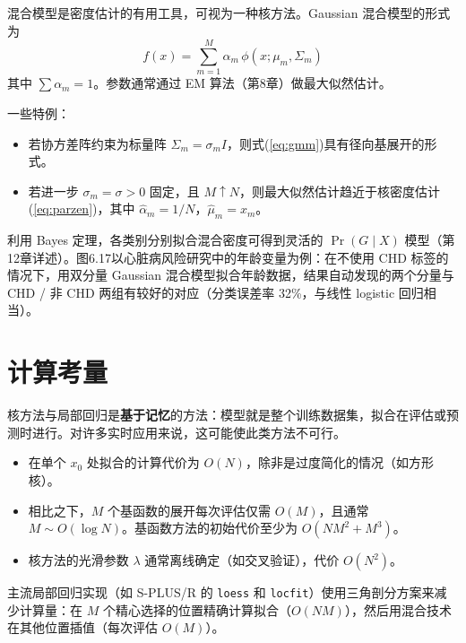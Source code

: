 混合模型是密度估计的有用工具，可视为一种核方法。Gaussian 混合模型的形式为
\begin{equation}\label{eq:gmm}
    f(x) = \sum_{m=1}^{M} \alpha_m \, \phi(x; \mu_m, \Sigma_m)
\end{equation}
其中 $\sum \alpha_m = 1$。参数通常通过 EM 算法（第8章）做最大似然估计。

一些特例：
\begin{itemize}
    \item 若协方差阵约束为标量阵 $\Sigma_m = \sigma_m I$，则式(\ref{eq:gmm})具有径向基展开的形式。
    \item 若进一步 $\sigma_m = \sigma > 0$ 固定，且 $M \uparrow N$，则最大似然估计趋近于核密度估计(\ref{eq:parzen})，其中 $\hat{\alpha}_m = 1/N$，$\hat{\mu}_m = x_m$。
\end{itemize}

利用 Bayes 定理，各类别分别拟合混合密度可得到灵活的 $\Pr(G \mid X)$ 模型（第12章详述）。图6.17以心脏病风险研究中的年龄变量为例：在不使用 CHD 标签的情况下，用双分量 Gaussian 混合模型拟合年龄数据，结果自动发现的两个分量与 CHD / 非 CHD 两组有较好的对应（分类误差率 32\%，与线性 logistic 回归相当）。

\section{计算考量}

核方法与局部回归是\textbf{基于记忆}的方法：模型就是整个训练数据集，拟合在评估或预测时进行。对许多实时应用来说，这可能使此类方法不可行。

\begin{itemize}
    \item 在单个 $x_0$ 处拟合的计算代价为 $O(N)$，除非是过度简化的情况（如方形核）。
    \item 相比之下，$M$ 个基函数的展开每次评估仅需 $O(M)$，且通常 $M \sim O(\log N)$。基函数方法的初始代价至少为 $O(N M^2 + M^3)$。
    \item 核方法的光滑参数 $\lambda$ 通常离线确定（如交叉验证），代价 $O(N^2)$。
\end{itemize}

主流局部回归实现（如 S-PLUS/R 的 \texttt{loess} 和 \texttt{locfit}）使用三角剖分方案来减少计算量：在 $M$ 个精心选择的位置精确计算拟合（$O(N M)$），然后用混合技术在其他位置插值（每次评估 $O(M)$）。